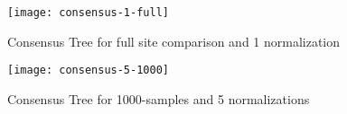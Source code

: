 \begin{figure}
\texttt{[image: consensus-1-full]}
\caption{Consensus Tree for full site comparison and 1 normalization}
\label{consensus-1-full}
\end{figure}

\begin{figure}
\texttt{[image: consensus-5-1000]}
\caption{Consensus Tree for 1000-samples and 5 normalizations}
\label{consensus-5-1000}
\end{figure}

